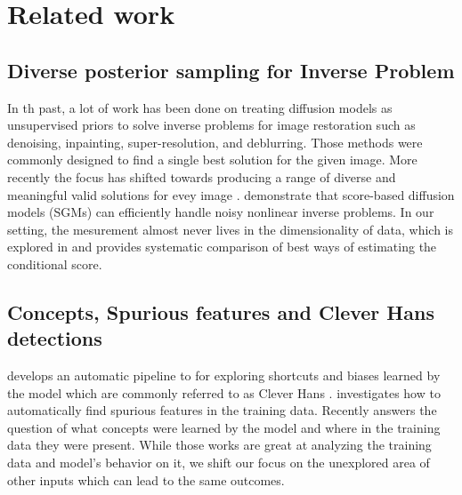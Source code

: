 \documentclass[licencjacka,en]{pracamgr}
\begin{document}
\chapter{Related work}\label{r:related_work}

\section{Diverse posterior sampling for Inverse Problem}
In th past, a lot of work has been done on treating diffusion models as unsupervised priors to solve inverse problems for image restoration such as denoising, inpainting, super-resolution, and deblurring. 
Those methods were commonly designed to find a single best solution for the given image.
More recently the focus has shifted towards producing a range of diverse and meaningful valid solutions for evey image \cite{cohen2024posteriorsamplingmeaningfuldiversity}.
\cite{chung2024diffusionposteriorsamplinggeneral} demonstrate that score-based diffusion models (SGMs) \cite{song2021scorebasedgenerativemodelingstochastic} can efficiently handle noisy nonlinear inverse problems.
In our setting, the mesurement almost never lives in the dimensionality of data, which is explored in \cite{batzolis2021conditionalimagegenerationscorebased} and provides systematic comparison of best ways of estimating the conditional score.

\section{Concepts, Spurious features and Clever Hans detections}
\cite{Lapuschkin_2019} develops an automatic pipeline to for exploring shortcuts and biases learned by the model which are commonly referred to as Clever Hans \cite{pfungst1911cleverHans}.
\cite{neuhaus2023spuriousfeatureslargescale} investigates how to automatically find spurious features in the training data.
Recently \cite{dreyer2025mechanisticunderstandingvalidationlarge} answers the question of what concepts were learned by the model and where in the training data they were present. 
While those works are great at analyzing the training data and model's behavior on it, we shift our focus on the unexplored area of other inputs which can lead to the same outcomes.
\end{document}
